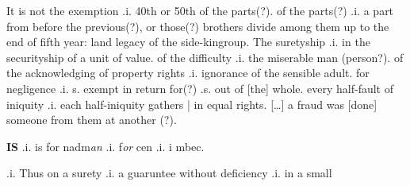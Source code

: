 \documentclass[11pt]{article}
\begin{document}
\begin{pages}
\begin{Rightside}
  It is not the exemption .i. 40th or 50th of the parts(?). of the parts(?) .i. a part from before the previous(?), or those(?) brothers divide among them up to the end of fifth year: land legacy of the side-kingroup. The suretyship .i. in the securityship of a unit of value.  of the difficulty .i. the miserable man (person?). of the acknowledging of property rights .i. ignorance of the sensible adult. for negligence .i. s. exempt in return for(?) .s. out of [the] whole. every half-fault of iniquity .i. each half-iniquity gathers | in equal rights. [\ldots{}]  a fraud was [done] someone from them at another (?). 

    \pend
  \endnumbering
  \end{Rightside}

  \Pages
\end{pages}

\begin{pages}
  \begin{Leftside}
    \beginnumbering\pstart
    \textbf{IS}  .i. is \hspace{2mm}for nadm\emph{an} .i. f\emph{or} \hspace{2mm}cen  .i. i mbec. 
    \pend
    \endnumbering
  \end{Leftside}

  \begin{Rightside}
    \beginnumbering\pstart
    [\ldots{}?] .i. Thus on a surety .i. a guaruntee without deficiency .i. in a small 
    \pend
    \endnumbering
  \end{Rightside}

  \Pages
\end{pages}
\end{document}

